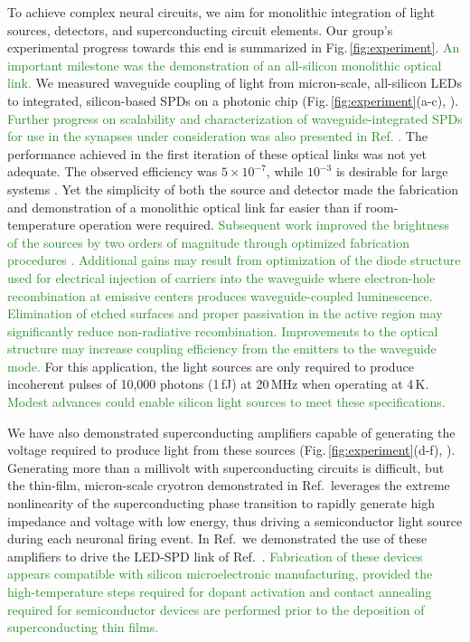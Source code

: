 \documentclass[twocolumn]{article}
\newcommand{\onlinecite}[1]{\hspace{-1 ex} \nocite{#1}\citenum{#1}}
\begin{document}
To achieve complex neural circuits, we aim for monolithic integration of light sources, detectors, and superconducting circuit elements. Our group's experimental progress towards this end is summarized in Fig.\,\ref{fig:experiment}. \textcolor{ForestGreen}{An important milestone was the demonstration of an all-silicon monolithic optical link.} We measured waveguide coupling of light from micron-scale, all-silicon LEDs to integrated, silicon-based SPDs on a  photonic chip (Fig.\,\ref{fig:experiment}(a-c), \cite{buch2017}). \textcolor{ForestGreen}{Further progress on scalability and characterization of waveguide-integrated SPDs for use in the synapses under consideration was also presented in Ref. \onlinecite{buta2020_2}.} The performance achieved in the first iteration of these optical links was not yet adequate. The observed efficiency was $5\times10^{-7}$, while $10^{-3}$ is desirable for large systems \cite{sh2019}. Yet the simplicity of both the source and detector made the fabrication and demonstration of a monolithic optical link far easier than if room-temperature operation were required. \textcolor{ForestGreen}{Subsequent work improved the brightness of the sources by two orders of magnitude through optimized fabrication procedures \cite{buta2020}. Additional gains may result from optimization of the diode structure used for electrical injection of carriers into the waveguide where electron-hole recombination at emissive centers produces waveguide-coupled luminescence. Elimination of etched surfaces and proper passivation in the active region may significantly reduce non-radiative recombination. Improvements to the optical structure may increase coupling efficiency from the emitters to the waveguide mode.} For this application, the light sources are only required to produce incoherent pulses of 10,000 photons (1\,fJ) at 20\,MHz when operating at 4\,K. \textcolor{ForestGreen}{Modest advances could enable silicon light sources to meet these specifications.}

We have also demonstrated superconducting amplifiers capable of generating the voltage required to produce light from these sources (Fig.\,\ref{fig:experiment}(d-f), \cite{mcve2019}). Generating more than a millivolt with superconducting circuits is difficult, but the thin-film, micron-scale cryotron demonstrated in Ref.\,\onlinecite{mcve2019} leverages the extreme nonlinearity of the superconducting phase transition to rapidly generate high impedance and voltage with low energy, thus driving a semiconductor light source during each neuronal firing event. In Ref.\,\onlinecite{mcve2019} we demonstrated the use of these amplifiers to drive the LED-SPD link of Ref.\,\onlinecite{buch2017}. \textcolor{ForestGreen}{Fabrication of these devices appears compatible with silicon microelectronic manufacturing, provided the high-temperature steps required for dopant activation and contact annealing required for semiconductor devices are performed prior to the deposition of superconducting thin films.}
\end{document}
